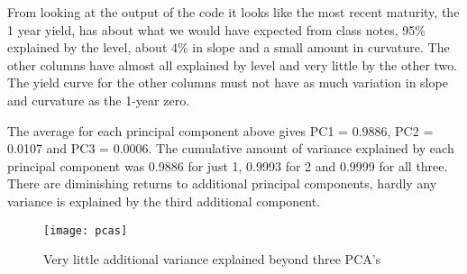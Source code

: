 \documentclass[]{article}
\begin{document}
From looking at the output of the  code it looks like the most recent maturity, the 1 year yield, has about what we would have expected from class notes, 95\% explained by the level, about 4\% in slope and a small amount in curvature. The other columns have almost all explained by level and very little by the other two. The yield curve for the other columns must not have as much variation in slope and curvature as the 1-year zero. 
\begin{table}[H]
\caption{For each maturity of the zero-coupon yield up to 10-year maturity the table above shows the amount of variance each principal component explains}
\end{table}	

The average for each principal component above gives PC1 = 0.9886, PC2 = 0.0107 and PC3 = 0.0006. The cumulative amount of variance explained by each principal component was 0.9886 for just 1, 0.9993 for 2 and 0.9999	for all three. There are diminishing returns to additional principal components, hardly any variance is explained by the third additional component. 
\begin{figure}[H]
	\centering
	\caption{Very little additional variance explained beyond three PCA's}
	\texttt{[image: pcas]}
\end{figure}


	
	
	
	
	
	
	
\end{document}
